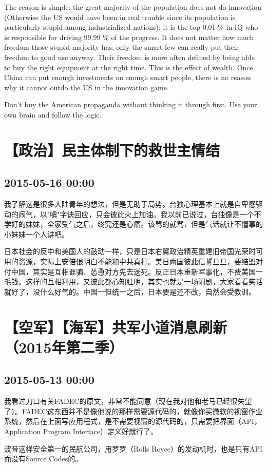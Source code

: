 \documentclass[twocolumn]{ctexart}
\begin{document}
The reason is simple: the great majority of the population does not do innovation (Otherwise the US would have been in real trouble since its population is particularly stupid among industrialized nations); it is the top 0.01 \%  in IQ who is responsible for driving 99.99 \%  of the progress. It does not matter how much freedom those stupid majority has; only the smart few can really put their freedom to good use anyway. Their freedom is more often defined by being able to buy the right equipment at the right time. This is the effect of wealth. Once China can put enough investments on enough smart people, there is no reason why it cannot outdo the US in the innovation game.

Don't buy the American propaganda without thinking it through first. Use your own brain and follow the logic.\section*{【政治】民主体制下的救世主情结}
\subsection*{2015-05-16 00:00}
我了解这是很多大陆青年的想法，但是无助于局势。台独心理基本上就是自卑感驱动的闹气，以"嗔"字诀回应，只会彼此火上加油。我以前已说过，台独像是一个不学好的妹妹，全家受气之后，终究还是心痛。该骂的就骂，但是气话就让不懂事的小妹妹一个人讲吧。

日本社会的反中和美国人的鼓动一样，只是日本右翼政治精英重建旧帝国光荣时可用的资源，实际上安倍很明白不能和中共真打。美日两国彼此信誓旦旦，要结盟对付中国，其实是互相诓骗、怂恿对方先去送死。反正日本重新军事化，不费美国一毛钱。这样的互相利用，又彼此都心知肚明，其实也就是一场闹剧，大家看看笑话就好了，没什么好气的。中国一但统一之后，日本要是还不改，自然会受教训。\section*{【空军】【海军】共军小道消息刷新（2015年第二季）}
\subsection*{2015-05-13 00:00}
我看过刀口有关FADEC的原文，非常不能同意（现在我对他和老马已经很失望了）。FADEC这东西并不是像他说的那样需要源代码的，就像你买微软的视窗作业系统，然后在上面写应用程式，是不需要视窗的源代码的，只需要把界面（API，Application Program Interface）定义好就行了。

波音这样安全第一的民航公司，用罗罗（Rolls Royce）的发动机时，也是只有API而没有Source Codes的。
\end{document}
